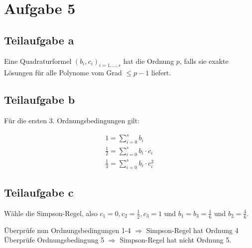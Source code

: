 \section*{Aufgabe 5}
\subsection*{Teilaufgabe a}
Eine Quadraturformel $(b_i, c_i)_{i=1, \dots, s}$ hat die Ordnung
$p$, falls sie exakte Lösungen für alle Polynome vom Grad $\leq p -1$
liefert.

\subsection*{Teilaufgabe b}
Für die ersten 3. Ordnungsbedingungen gilt:

\begin{align*}
	1 = \sum_{i = 0}^{s} b_i \\
 	\frac{1}{2} = \sum_{i = 0}^{s} b_i \cdot c_i \\
 	\frac{1}{3} = \sum_{i = 0}^{s} b_i \cdot c_i^2
\end{align*}

\subsection*{Teilaufgabe c}
Wähle die Simpson-Regel, also $c_1=0, c_2 = \frac{1}{2}, c_3 = 1$ und 
$b_1 = b_3 = \frac{1}{6}$ und $b_2 = \frac{4}{6}$.

Überprüfe nun Ordnungsbedingungen 1-4 $\Rightarrow$ Simpson-Regel hat Ordnung 4
Überprüfe Ordnungsbedingung 5 $\Rightarrow$ Simpson-Regel hat nicht Ordnung 5. %
